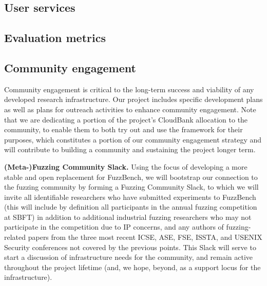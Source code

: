 
\subsection{User services}
\label{sec:user-services}


\subsection{Evaluation metrics}


\subsection{Community engagement}


Community engagement is critical to the long-term success and viability of any
developed research infrastructure.  Our project includes specific development
plans as well as plans for outreach activities to enhance community engagement.  
Note that we are dedicating a portion of the project's CloudBank allocation to
the community, to enable them to both try out and use the framework for their
purposes, which constitutes a portion of our community engagement strategy and
will contribute to building a community and sustaining the project
longer term.


\vspace{1ex}
\noindent\textbf{(Meta-)Fuzzing Community Slack.}  Using the focus of developing a more stable and
open replacement for FuzzBench, we will bootstrap our connection to
the fuzzing community by forming a Fuzzing Community Slack, to which
we will invite all identifiable researchers who have submitted
experiments to FuzzBench (this will include by definition all
participants in the annual fuzzing competition at SBFT) in addition to
additional industrial fuzzing researchers who may not participate in
the competition due to IP concerns, and any authors of fuzzing-related
papers from the three most recent ICSE, ASE, FSE, ISSTA, and USENIX
Security conferences not covered by the previous points.  This Slack
will serve to start a discussion of infrastructure needs for the
community, and remain active throughout the project lifetime (and, we
hope, beyond, as a support locus for the infrastructure).


